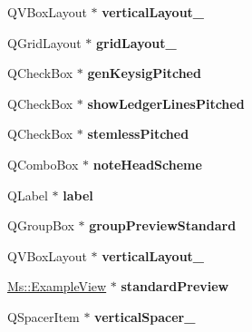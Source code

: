 \begin{DoxyCompactItemize}
Q\+V\+Box\+Layout $\ast$ {\bfseries vertical\+Layout\+\_}
\item 
\mbox{\label{class_ui___edit_staff_type_a60efc362e52ab13100d67ce2295cbf84}} 
Q\+Grid\+Layout $\ast$ {\bfseries grid\+Layout\+\_}
\item 
\mbox{\label{class_ui___edit_staff_type_abe48fe77a91e5dab0bc2d75d2e89d12c}} 
Q\+Check\+Box $\ast$ {\bfseries gen\+Keysig\+Pitched}
\item 
\mbox{\label{class_ui___edit_staff_type_aecca68a96e872724bf27a57f6b25b440}} 
Q\+Check\+Box $\ast$ {\bfseries show\+Ledger\+Lines\+Pitched}
\item 
\mbox{\label{class_ui___edit_staff_type_a9fada13c671ac47862a2797b2c2c5af8}} 
Q\+Check\+Box $\ast$ {\bfseries stemless\+Pitched}
\item 
\mbox{\label{class_ui___edit_staff_type_a639609107807df87348ad046a5ab460a}} 
Q\+Combo\+Box $\ast$ {\bfseries note\+Head\+Scheme}
\item 
\mbox{\label{class_ui___edit_staff_type_a93d3fad09084db7c999c3f7e9d239280}} 
Q\+Label $\ast$ {\bfseries label}
\item 
\mbox{\label{class_ui___edit_staff_type_ad0175c923a190c94f7863c81e1ff19e9}} 
Q\+Group\+Box $\ast$ {\bfseries group\+Preview\+Standard}
\item 
\mbox{\label{class_ui___edit_staff_type_a1f092b6b638ca76c9fbf9299e886905c}} 
Q\+V\+Box\+Layout $\ast$ {\bfseries vertical\+Layout\+\_}
\item 
\mbox{\label{class_ui___edit_staff_type_af45ccf428804ee5313a0a9715e11ec63}} 
\hyperlink{class_ms_1_1_example_view}{Ms\+::\+Example\+View} $\ast$ {\bfseries standard\+Preview}
\item 
\mbox{\label{class_ui___edit_staff_type_a20b5d4cf0548fe743488b6e8a4e91257}} 
Q\+Spacer\+Item $\ast$ {\bfseries vertical\+Spacer\+\_}

\end{DoxyCompactItemize}
